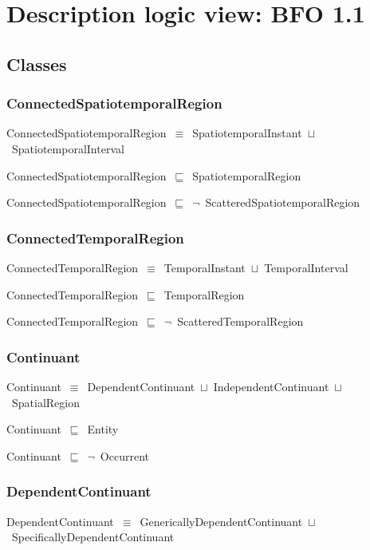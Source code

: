 \documentclass{article}
\begin{document}
\section*{Description logic view: BFO 1.1}
\subsection*{Classes}

\subsubsection*{ConnectedSpatiotemporalRegion}

ConnectedSpatiotemporalRegion~\ensuremath{\equiv}~SpatiotemporalInstant~\ensuremath{\sqcup}~SpatiotemporalInterval

ConnectedSpatiotemporalRegion~\ensuremath{\sqsubseteq}~SpatiotemporalRegion~

ConnectedSpatiotemporalRegion~\ensuremath{\sqsubseteq}~\ensuremath{\lnot}~ScatteredSpatiotemporalRegion

\subsubsection*{ConnectedTemporalRegion}

ConnectedTemporalRegion~\ensuremath{\equiv}~TemporalInstant~\ensuremath{\sqcup}~TemporalInterval

ConnectedTemporalRegion~\ensuremath{\sqsubseteq}~TemporalRegion~

ConnectedTemporalRegion~\ensuremath{\sqsubseteq}~\ensuremath{\lnot}~ScatteredTemporalRegion

\subsubsection*{Continuant}

Continuant~\ensuremath{\equiv}~DependentContinuant~\ensuremath{\sqcup}~IndependentContinuant~\ensuremath{\sqcup}~SpatialRegion

Continuant~\ensuremath{\sqsubseteq}~Entity~

Continuant~\ensuremath{\sqsubseteq}~\ensuremath{\lnot}~Occurrent

\subsubsection*{DependentContinuant}

DependentContinuant~\ensuremath{\equiv}~GenericallyDependentContinuant~\ensuremath{\sqcup}~SpecificallyDependentContinuant
\end{document}
